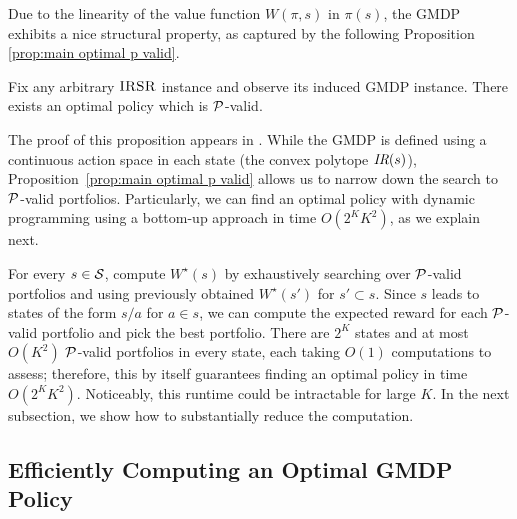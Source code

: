 Due to the linearity of the value function $W(\pi,s)$ in $\pi(s)$, the GMDP exhibits a nice structural property, as captured by the following Proposition \ref{prop:main optimal p valid}. 
\begin{proposition}\label{prop:main optimal p valid}
Fix any arbitrary $\textsc{IRSR}$ instance and observe its induced GMDP instance. There exists an optimal policy which is $\mathcal{P}$-valid.
\end{proposition}
The proof of this proposition appears in {\ifnum{}\fi}. While the GMDP is defined using a continuous action space in each state (the convex polytope $\textit{IR}(s)$), Proposition~\ref{prop:main optimal p valid} allows us to narrow down the search to $\mathcal{P}$-valid portfolios. Particularly, we can find an optimal policy with dynamic programming using a bottom-up approach in time $O(2^K K^2)$, as we explain next.

For every $s \in \mathcal{S}$, compute $W^{\star}(s)$ by exhaustively searching over $\mathcal{P}$-valid portfolios and using previously obtained $W^{\star}(s')$ for $s' \subset s$. Since $s$ leads to states of the form $s/{a}$ for $a\in s$, we can compute the expected reward for each $\mathcal{P}$-valid portfolio and pick the best portfolio. There are $2^K$ states and at most $O(K^2)$ $\mathcal{P}$-valid portfolios in every state, each taking $O(1)$ computations to assess; therefore, this by itself guarantees finding an optimal policy in time $O(2^K K^2)$. Noticeably, this runtime could be intractable for large $K$. 
In the next subsection, we show how to substantially reduce the computation.

\subsection{Efficiently Computing an Optimal GMDP Policy}\label{subsec:optimal GMDP policy}

